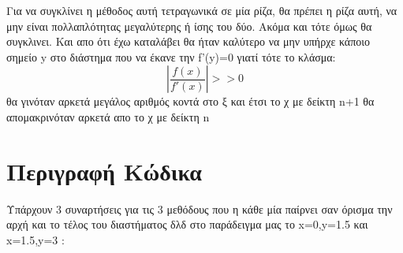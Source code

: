 \documentclass{article}
\begin{document}
    Για να συγκλίνει η μέθοδος αυτή τετραγωνικά σε μία ρίζα, θα πρέπει η ρίζα αυτή, να μην είναι πολλαπλότητας μεγαλύτερης ή ίσης του δύο. Ακόμα και τότε όμως θα συγκλινει. Και απο ότι έχω καταλάβει θα ήταν καλύτερο να μην υπήρχε κάποιο σημείο y στο διάστημα που να έκανε την f'(y)=0 
    γιατί τότε το κλάσμα:    
    \begin{equation}
        |\frac{f(x)}{f'(x)}|>>0
    \end{equation} θα γινόταν αρκετά μεγάλος αριθμός κοντά στο ξ και έτσι το χ με δείκτη n+1 θα απομακρινόταν αρκετά απο το χ με δείκτη n
    \section{ Περιγραφή Κώδικα}
    
    Υπάρχουν 3 συναρτήσεις  για τις 3 μεθόδους που η κάθε μία παίρνει σαν όρισμα την αρχή και το τέλος του διαστήματος δλδ στο παράδειγμα μας το x=0,y=1.5 και x=1.5,y=3 : 
\end{document}
